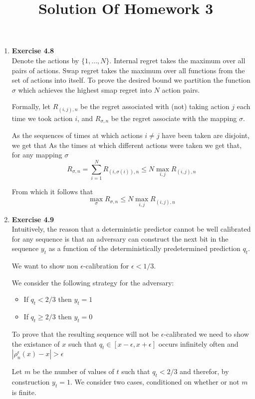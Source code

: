 \documentclass[12pt]{article}
\title{Solution Of Homework 3}
\begin{document}
\maketitle
\begin{enumerate}
\item {\bf Exercise 4.8} \\

  Denote the actions by $\{1,\ldots,N\}$. Internal regret takes the
  maximum over all pairs of actions. Swap regret takes the maximum
  over all functions from the set of actions into itself. To prove the
  desired bound we partition the function $\sigma$ which achieves the highest
  smap regret  into $N$ action pairs.

Formally, let $R_{(i,j),n}$ be the regret associated with (not) taking
  action $j$ each time we took action $i$, and $R_{\sigma,n}$ be the
  regret associate with the mapping $\sigma$.

As the sequences of times at which actions $i \neq j$ have been taken
are disjoint, we get that As the times at which different actions were
taken we get that, for any mapping $\sigma$
\[
R_{\sigma,n} = \sum_{i=1}^N R_{(i,\sigma(i)),n} \leq N \max_{i,j} R_{(i,j),n}
\]

From which it follows that 
\[
\max_\sigma R_{\sigma,n} \leq N \max_{i,j} R_{(i,j),n}
\]

\item {\bf Exercise 4.9} \\

Intuitively, the reason that a deterministic predictor cannot be well
calibrated for any sequence is that an adversary can construct the
next bit in the sequence $y_t$ as a function of the deterministically
predetermined prediction $q_t$.

We want to show non $\epsilon$-calibration for $\epsilon<1/3$.

We consider the following strategy for the adversary:
\begin{itemize}
\item If $q_t<2/3$ then $y_t=1$
\item If $q_t\geq 2/3$ then $y_t=0$
\end{itemize}

To prove that the resulting sequence will not be
$\epsilon$-calibrated we need to show the existance of $x$ such that 
$q_t \in [x-\epsilon,x+\epsilon]$ occurs infinitely often and
$| \rho_n^{\epsilon}(x)-x | > \epsilon$

Let $m$ be the number of values of $t$ such that $q_t<2/3$ and
therefor, by construction $y_t=1$. We consider two cases, conditioned
on whether or not $m$ is finite.


\end{enumerate}
\end{document}
